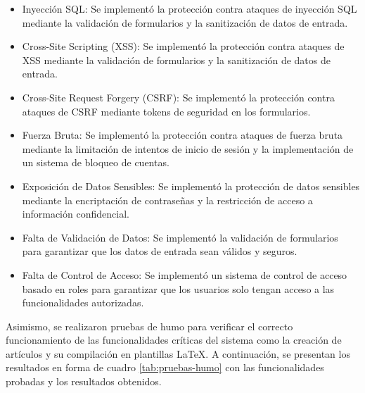 \begin{itemize}
    \item Inyección SQL: Se implementó la protección contra ataques de inyección SQL mediante la validación de formularios y la sanitización de datos de entrada.
    \item Cross-Site Scripting (XSS): Se implementó la protección contra ataques de XSS mediante la validación de formularios y la sanitización de datos de entrada.
    \item Cross-Site Request Forgery (CSRF): Se implementó la protección contra ataques de CSRF mediante tokens de seguridad en los formularios.
    \item Fuerza Bruta: Se implementó la protección contra ataques de fuerza bruta mediante la limitación de intentos de inicio de sesión y la implementación de un sistema de bloqueo de cuentas.
    \item Exposición de Datos Sensibles: Se implementó la protección de datos sensibles mediante la encriptación de contraseñas y la restricción de acceso a información confidencial.
    \item Falta de Validación de Datos: Se implementó la validación de formularios para garantizar que los datos de entrada sean válidos y seguros.
    \item Falta de Control de Acceso: Se implementó un sistema de control de acceso basado en roles para garantizar que los usuarios solo tengan acceso a las funcionalidades autorizadas.
\end{itemize}

Asimismo, se realizaron pruebas de humo para verificar el correcto funcionamiento de las funcionalidades críticas del sistema como la creación de artículos y su compilación en plantillas LaTeX. A continuación, se presentan los resultados en forma de cuadro \ref{tab:pruebas-humo} con las funcionalidades probadas y los resultados obtenidos.

